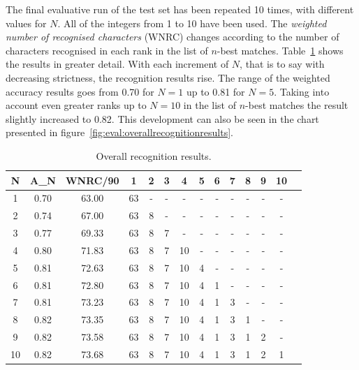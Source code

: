 The final evaluative run of the test set has been repeated 10 times, 
with different values for \(N\). All of the integers from 1 to 10 have
been used. The \emph{weighted number of recognised characters} (WNRC) changes 
according to the number of characters recognised in each rank in the
list of \(n\)-best matches. Table~\ref{table:eval:overallrecognitionresults}
shows the results in greater detail. With each increment of \(N\),
that is to say with decreasing strictness, the recognition results rise.
The range of the weighted accuracy results goes from 0.70 for \(N=1\) 
up to 0.81 for \(N=5\). Taking into account even greater ranks up 
to \(N = 10\) in the list of \(n\)-best matches the result slightly increased
to 0.82. This development can also be seen in the chart presented in 
figure~\ref{fig:eval:overallrecognitionresults}.
\begin{table}[htbp]
\begin{center}
  \begin{tabular}{|c|c|c|c|c|c|c|c|c|c|c|c|c|p{200pt}|}
    \hline
N & A_N  &WNRC/90&  1 & 2 & 3 & 4  & 5 & 6 & 7 & 8 & 9 & 10 \\
    \hline
1 & 0.70 & 63.00 & 63 & - & - & -  & - & - & - & - & - & -  \\
    \hline
2 & 0.74 & 67.00 & 63 & 8 & - & -  & - & - & - & - & - & -  \\
    \hline
3 & 0.77 & 69.33 & 63 & 8 & 7 & -  & - & - & - & - & - & -  \\
    \hline
4 & 0.80 & 71.83 & 63 & 8 & 7 & 10 & - & - & - & - & - & -  \\
    \hline
5 & 0.81 & 72.63 & 63 & 8 & 7 & 10 & 4 & - & - & - & - & -  \\
    \hline
6 & 0.81 & 72.80 & 63 & 8 & 7 & 10 & 4 & 1 & - & - & - & -  \\
    \hline
7 & 0.81 & 73.23 & 63 & 8 & 7 & 10 & 4 & 1 & 3 & - & - & -  \\
    \hline
8 & 0.82 & 73.35 & 63 & 8 & 7 & 10 & 4 & 1 & 3 & 1 & - & -  \\
    \hline
9 & 0.82 & 73.58 & 63 & 8 & 7 & 10 & 4 & 1 & 3 & 1 & 2 & -  \\
    \hline
10& 0.82 & 73.68 & 63 & 8 & 7 & 10 & 4 & 1 & 3 & 1 & 2 & 1  \\
    \hline
  \end{tabular}
\end{center}
\caption{Overall recognition results.}
\label{table:eval:overallrecognitionresults}
\end{table}

